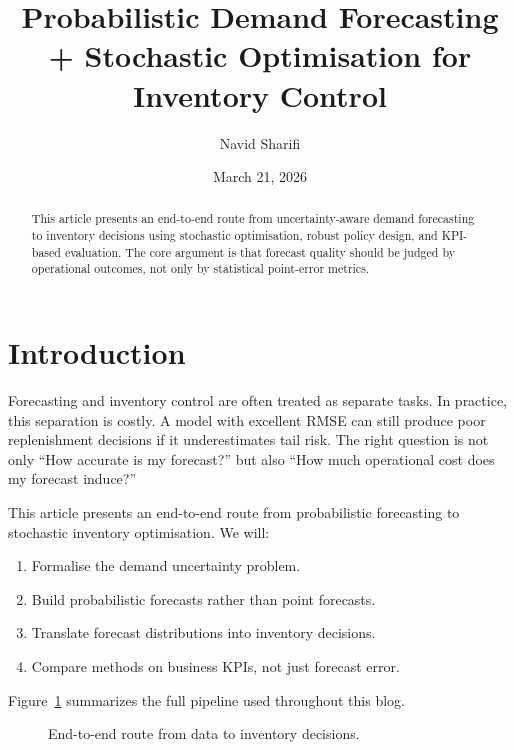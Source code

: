 \documentclass[11pt,a4paper]{article}
\title{Probabilistic Demand Forecasting + Stochastic Optimisation for Inventory Control}
\author{Navid Sharifi}
\date{March 21, 2026}
\begin{document}
\maketitle

\begin{abstract}
This article presents an end-to-end route from uncertainty-aware demand forecasting to inventory decisions using stochastic optimisation, robust policy design, and KPI-based evaluation. The core argument is that forecast quality should be judged by operational outcomes, not only by statistical point-error metrics.
\end{abstract}

\section{Introduction}

Forecasting and inventory control are often treated as separate tasks. In practice, this separation is costly. A model with excellent RMSE can still produce poor replenishment decisions if it underestimates tail risk. The right question is not only ``How accurate is my forecast?'' but also ``How much operational cost does my forecast induce?''

This article presents an end-to-end route from probabilistic forecasting to stochastic inventory optimisation. We will:

\begin{enumerate}
    \item Formalise the demand uncertainty problem.
    \item Build probabilistic forecasts rather than point forecasts.
    \item Translate forecast distributions into inventory decisions.
    \item Compare methods on business KPIs, not just forecast error.
\end{enumerate}

Figure~\ref{fig:pipeline} summarizes the full pipeline used throughout this blog.

\begin{figure}[H]
\centering
{}
\caption{End-to-end route from data to inventory decisions.}
\label{fig:pipeline}
\end{figure}
\end{document}
